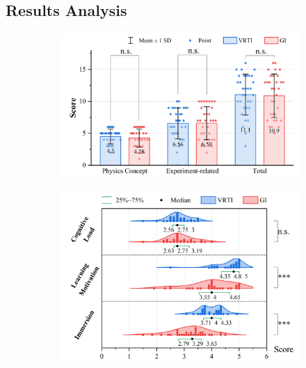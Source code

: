 \documentclass[sigconf,review,anonymous]{acmart}
\begin{document}
\subsection{Results Analysis}
\begin{figure}[t]
  \centering
  \begin{subfigure}{0.45\textwidth} %
    \centering
    \includegraphics[width=\linewidth]{image/pre-test-result.pdf}
    \caption{} %
    \label{fig:pre-test-result}
  \end{subfigure}
  \hspace{0.05\textwidth} %
  \begin{subfigure}{0.45\textwidth} %
    \centering
    \includegraphics[width=\linewidth]{image/user-experience-result.pdf}
    \caption{} %
    \label{fig:user-experience-result}
  \end{subfigure}

\end{figure}
\end{document}

